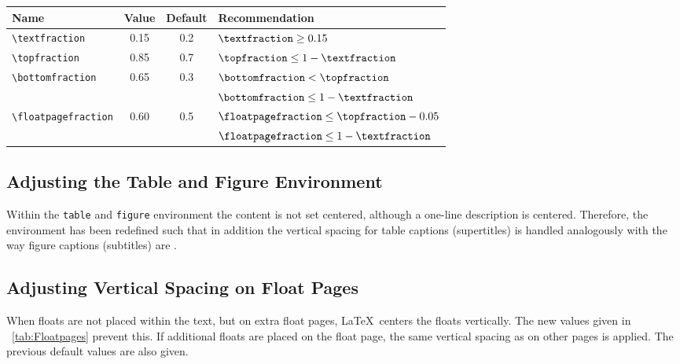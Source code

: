 \documentclass{article}
\begin{document}
\begin{minipage}{\linewidth}
\centering%
%
\label{tab:Placement}%
\small
\renewcommand{\arraystretch}{1.25}
\begin{tabular}{@{}l*{2}{c}l@{}}\hline
   Name                      & Value       & Default      & Recommendation\\ \hline
   \verb|\textfraction|      & 0.15       & 0.2          & $\verb|\textfraction| \ge 0.15$\\
   \verb|\topfraction|       & 0.85       & 0.7          & $\verb|\topfraction| \le 1-\verb|\textfraction|$\\
   \verb|\bottomfraction|    & 0.65       & 0.3          & $\verb|\bottomfraction| < \verb|\topfraction|$\\
                             &            &              & $\verb|\bottomfraction| \le 1-\verb|\textfraction|$\\
   \verb|\floatpagefraction| & 0.60       & 0.5          & $\verb|\floatpagefraction| \le \verb|\topfraction|-0.05$\\
                             &            &              & $\verb|\floatpagefraction| \le 1-\verb|\textfraction|$\\ \hline
\end{tabular}
\end{minipage}

\subsection{Adjusting the Table and Figure Environment}
Within the \verb|table| and \verb|figure| environment the content is not set centered,
although a one-line description is centered. Therefore, the environment has been redefined 
such that in addition the vertical spacing for table captions (supertitles) is handled analogously with the way figure captions (subtitles) are \cite{Reichert2}.

\subsection{Adjusting Vertical Spacing on Float Pages}
When floats are not placed within the text, but on extra float pages, \LaTeX\ centers the floats vertically. The new values given in \tablename~\ref{tab:Floatpages} prevent this. If additional floats are placed on the float page, the same vertical spacing as on other pages is applied. The previous default values are also given.
\end{document}
